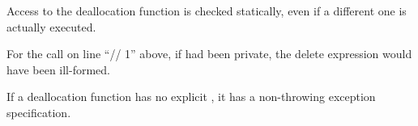\pnum
Access to the deallocation function is checked statically,
even if a different one is actually executed.
\begin{example}
For the call on line ``// 1'' above,
if
had been private, the delete expression would have been ill-formed.
\end{example}

\pnum
\begin{note}
If a deallocation function has no explicit , it
has a non-throwing exception specification.
\end{note}

